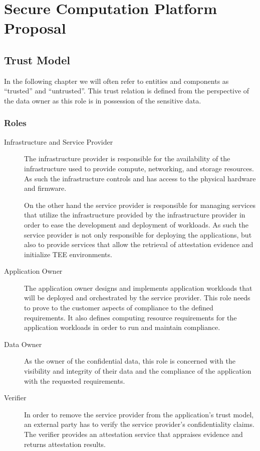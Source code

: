 \chapter{Secure Computation Platform Proposal}
\label{ch:proposal}

\section{Trust Model}
\label{sec:trust-model}

In the following chapter we will often refer to entities and components as
``trusted'' and ``untrusted''. This trust relation is defined from the
perspective of the data owner as this role is in possession of the sensitive
data.

\subsection{Roles}

\begin{description}
  \item[Infrastructure and Service Provider]
    The infrastructure provider is responsible for the availability of the
    infrastructure used to provide compute, networking, and storage resources.
    As such the infrastructure controls and has access to the physical hardware
    and firmware.

    On the other hand the service provider is responsible for managing services
    that utilize the infrastructure provided by the infrastructure provider in
    order to ease the development and deployment of workloads. As such the
    service provider is not only responsible for deploying the applications, but
    also to provide services that allow the retrieval of attestation evidence
    and initialize TEE environments.

  \item[Application Owner]
    The application owner designs and implements application workloads that will
    be deployed and orchestrated by the service provider. This role needs to
    prove to the customer aspects of compliance to the defined requirements. It
    also defines computing resource requirements for the application workloads
    in order to run and maintain compliance.

  \item[Data Owner]
    As the owner of the confidential data, this role is concerned with the
    visibility and integrity of their data and the compliance of the application
    with the requested requirements.

  \item[Verifier]
    In order to remove the service provider from the application's trust model,
    an external party has to verify the service provider's confidentiality
    claims. The verifier provides an attestation service that appraises evidence
    and returns attestation results.
\end{description}

